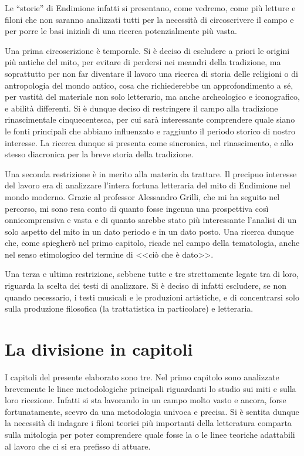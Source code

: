 \documentclass[12pt,a4paper,openright, oneside]{book}
\begin{document}
Le ``storie'' di Endimione infatti si presentano, come vedremo, come più letture e filoni che non saranno analizzati tutti per la necessità di circoscrivere il campo e per porre le basi iniziali di una ricerca potenzialmente più vasta.

Una prima circoscrizione è temporale. Si è deciso di escludere a priori le origini più antiche del mito, per evitare di perdersi nei meandri della tradizione, ma soprattutto per non far diventare il lavoro una ricerca di storia delle religioni o di antropologia del mondo antico, cosa che richiederebbe un approfondimento a sé, per vastità del materiale non solo letterario, ma anche archeologico e iconografico, e abilità differenti. Si è dunque deciso di restringere il campo alla tradizione rinascimentale cinquecentesca, per cui sarà interessante comprendere quale siano le fonti principali che abbiano influenzato e raggiunto il periodo storico di nostro interesse. La ricerca dunque si presenta come sincronica, nel rinascimento, e allo stesso diacronica per la breve storia della tradizione.

Una seconda restrizione è in merito alla materia da trattare. Il precipuo interesse del lavoro era di analizzare l'intera fortuna letteraria del mito di Endimione nel mondo moderno. Grazie al professor Alessandro Grilli, che mi ha seguito nel percorso, mi sono resa conto di quanto fosse ingenua una prospettiva così onnicomprensiva e vasta e di quanto sarebbe stato più interessante l'analisi di un solo aspetto del mito in un dato periodo e in un dato posto. Una ricerca dunque che, come spiegherò nel primo capitolo, ricade nel campo della tematologia, anche nel senso etimologico del termine di <<ciò che è dato>>.

Una terza e ultima restrizione, sebbene tutte e tre strettamente legate tra di loro, riguarda la scelta dei testi di analizzare. Si è deciso di infatti escludere, se non quando necessario, i testi musicali e le produzioni artistiche, e di concentrarsi solo sulla produzione filosofica (la trattatistica in particolare) e letteraria. 

\section{La divisione in capitoli}

I capitoli del presente elaborato sono tre.
Nel primo capitolo sono analizzate brevemente le linee metodologiche principali riguardanti lo studio sui miti e sulla loro ricezione. Infatti si sta lavorando in un campo molto vasto e ancora, forse fortunatamente, scevro da una metodologia univoca e precisa. Si è sentita dunque la necessità di indagare i filoni teorici più importanti della letteratura comparta sulla mitologia per poter comprendere quale fosse la o le linee teoriche adattabili al lavoro che ci si era prefisso di attuare.
\end{document}
